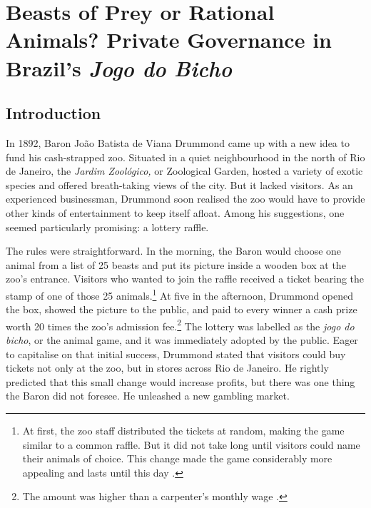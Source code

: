 \chapter{Beasts of Prey or Rational Animals? Private Governance in Brazil's \emph{Jogo do Bicho}}
\label{chap:bicho}

\section{Introduction}
\label{sec:intro}

In 1892, Baron João Batista de Viana Drummond came up with a new idea to fund his cash-strapped zoo. Situated in a quiet neighbourhood in the north of Rio de Janeiro, the \emph{Jardim Zoológico,} or Zoological Garden, hosted a variety of exotic species and offered breath-taking views of the city. But it lacked visitors. As an experienced businessman, Drummond soon realised the zoo would have to provide other kinds of entertainment to keep itself afloat. Among his suggestions, one seemed particularly promising: a lottery raffle.

The rules were straightforward. In the morning, the Baron would choose one animal from a list of 25 beasts and put its picture inside a wooden box at the zoo's entrance. Visitors who wanted to join the raffle received a ticket bearing the stamp of one of those 25 animals.\footnote{At first, the zoo staff distributed the tickets at random, making the game similar to a common raffle. But it did not take long until visitors could name their animals of choice. This change made the game considerably more appealing and lasts until this day \citep[71--74]{da1999aguias}.} At five in the afternoon, Drummond opened the box, showed the picture to the public, and paid to every winner a cash prize worth 20 times the zoo's admission fee.\footnote{The amount was higher than a carpenter's monthly wage \citep[542]{chazkel2007beyond}.} The lottery was labelled as the \emph{jogo do bicho}, or the animal game, and it was immediately adopted by the public. Eager to capitalise on that initial success, Drummond stated that visitors could buy tickets not only at the zoo, but in stores across Rio de Janeiro. He rightly predicted that this small change would increase profits, but there was one thing the Baron did not foresee. He unleashed a new gambling market.

